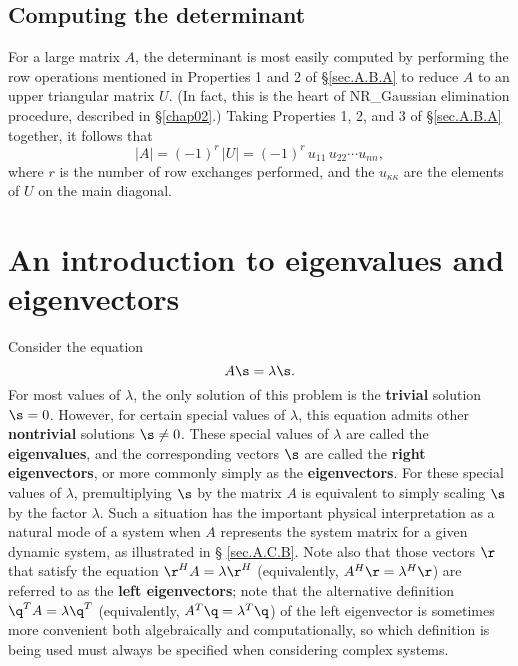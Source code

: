 \subsection{Computing the determinant}\label{sec.A.B.B}

For a large matrix $A$, the determinant is most easily computed by
performing the row operations mentioned in Properties 1 and 2
of \S \ref{sec.A.B.A} to reduce $A$ to an upper triangular
matrix $U$.  (In fact, this is the heart of NR_Gaussian elimination
procedure, described in \S \ref{chap02}.)  Taking Properties 1, 2, and
3 of \S \ref{sec.A.B.A} together, it follows that
\begin{equation*}
|A| = (-1)^r\,|U| = (-1)^r\,u_{11}\,u_{22}\cdots u_{nn},
\end{equation*}
where $r$ is the number of row exchanges performed, and the
$u_{\kappa\kappa}$ are the elements of $U$ on the main
diagonal.  

\section{An introduction to eigenvalues and eigenvectors}\label{sec.A.C}

Consider the equation
\begin{equation}
A\s = \lambda \s.
\label{emodedef}
\end{equation}
For most values of $\lambda$, the only solution of this problem is the
{\bf trivial} solution $\s=0$.  However, for certain special values of
$\lambda$, this equation admits other {\bf nontrivial} solutions $\s\ne
0$.  These special values of $\lambda$ are called the {\bf
eigenvalues}, and the corresponding vectors $\s$ are called the {\bf
right eigenvectors}, or more commonly simply as the {\bf
eigenvectors}.  For these special values of $\lambda$, premultiplying
$\s$ by the matrix $A$ is equivalent to simply scaling $\s$ by the
factor $\lambda$.  Such a situation has the important physical
interpretation as a natural mode of a system when $A$ represents the
system matrix for a given dynamic system, as illustrated in \S
\ref{sec.A.C.B}.  Note also that those vectors $\r$ that satisfy the
equation $\r^{H} A = \lambda \r^{H}$ (equivalently, $A^{H}\r=\lambda^{H} \r$) are referred to as the {\bf left eigenvectors};
note that the alternative definition $\q^{T} A = \lambda \q^{T}$  (equivalently, $A^{T}\q=\lambda^{T} \q$)
of the left eigenvector is sometimes more convenient both algebraically and computationally,
so which definition is being used must always be specified when considering complex systems.

